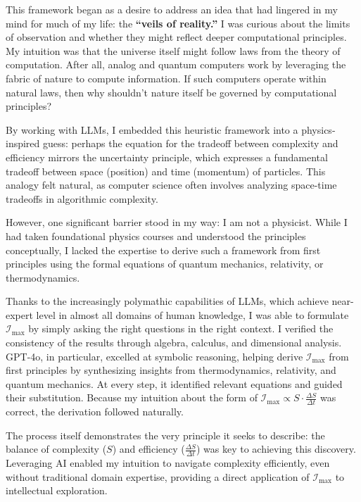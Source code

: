 \documentclass[12pt]{article}
\begin{document}
This framework began as a desire to address an idea that had lingered in my mind for much of my life: the \textbf{``veils of reality.''} I was curious about the limits of observation and whether they might reflect deeper computational principles. My intuition was that the universe itself might follow laws from the theory of computation. After all, analog and quantum computers work by leveraging the fabric of nature to compute information. If such computers operate within natural laws, then why shouldn’t nature itself be governed by computational principles?

By working with LLMs, I embedded this heuristic framework into a physics-inspired guess: perhaps the equation for the tradeoff between complexity and efficiency mirrors the uncertainty principle, which expresses a fundamental tradeoff between space (position) and time (momentum) of particles. This analogy felt natural, as computer science often involves analyzing space-time tradeoffs in algorithmic complexity.

However, one significant barrier stood in my way: I am not a physicist. While I had taken foundational physics courses and understood the principles conceptually, I lacked the expertise to derive such a framework from first principles using the formal equations of quantum mechanics, relativity, or thermodynamics.

Thanks to the increasingly polymathic capabilities of LLMs, which achieve near-expert level in almost all domains of human knowledge, I was able to formulate \(\mathcal{I}_{\text{max}}\) by simply asking the right questions in the right context. I verified the consistency of the results through algebra, calculus, and dimensional analysis. GPT-4o, in particular, excelled at symbolic reasoning, helping derive \(\mathcal{I}_{\text{max}}\) from first principles by synthesizing insights from thermodynamics, relativity, and quantum mechanics. At every step, it identified relevant equations and guided their substitution. Because my intuition about the form of \(\mathcal{I}_{\text{max}} \propto S \cdot \frac{\Delta S}{\Delta t}\) was correct, the derivation followed naturally.

The process itself demonstrates the very principle it seeks to describe: the balance of complexity (\(S\)) and efficiency (\(\frac{\Delta S}{\Delta t}\)) was key to achieving this discovery. Leveraging AI enabled my intuition to navigate complexity efficiently, even without traditional domain expertise, providing a direct application of \(\mathcal{I}_{\text{max}}\) to intellectual exploration.
\end{document}
